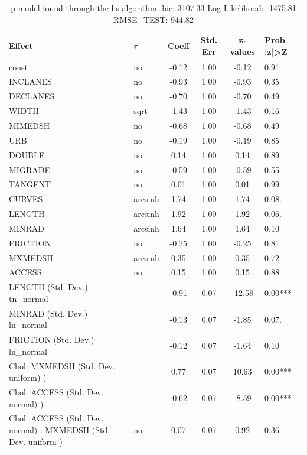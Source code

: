 \begin{table}
	\caption{p model found through the hs algorithm. bic: 3107.33 Log-Likelihood: -1475.81 RMSE_TEST: 944.82}
	\begin{center}
		\begin{tabular}{|l|l|c|c|c|l|}
			\hline
			Effect & $\tau$ & Coeff & Std. Err & z-values & Prob |z|>Z \\
			\hline
			const & no & -0.12 & 1.00 & -0.12 & 0.91 \\
			\hline
			INCLANES & no & -0.93 & 1.00 & -0.93 & 0.35 \\
			\hline
			DECLANES & no & -0.70 & 1.00 & -0.70 & 0.49 \\
			\hline
			WIDTH & sqrt & -1.43 & 1.00 & -1.43 & 0.16 \\
			\hline
			MIMEDSH & no & -0.68 & 1.00 & -0.68 & 0.49 \\
			\hline
			URB & no & -0.19 & 1.00 & -0.19 & 0.85 \\
			\hline
			DOUBLE & no & 0.14 & 1.00 & 0.14 & 0.89 \\
			\hline
			MIGRADE & no & -0.59 & 1.00 & -0.59 & 0.55 \\
			\hline
			TANGENT & no & 0.01 & 1.00 & 0.01 & 0.99 \\
			\hline
			CURVES & arcsinh & 1.74 & 1.00 & 1.74 & 0.08. \\
			\hline
			LENGTH & arcsinh & 1.92 & 1.00 & 1.92 & 0.06. \\
			\hline
			MINRAD & arcsinh & 1.64 & 1.00 & 1.64 & 0.10 \\
			\hline
			FRICTION & no & -0.25 & 1.00 & -0.25 & 0.81 \\
			\hline
			MXMEDSH & arcsinh & 0.35 & 1.00 & 0.35 & 0.72 \\
			\hline
			ACCESS & no & 0.15 & 1.00 & 0.15 & 0.88 \\
			\hline
			LENGTH (Std. Dev.) tn_normal &  & -0.91 & 0.07 & -12.58 & 0.00*** \\
			\hline
			MINRAD (Std. Dev.) ln_normal &  & -0.13 & 0.07 & -1.85 & 0.07. \\
			\hline
			FRICTION (Std. Dev.) ln_normal &  & -0.12 & 0.07 & -1.64 & 0.10 \\
			\hline
			 Chol: MXMEDSH (Std. Dev. uniform) ) &  & 0.77 & 0.07 & 10.63 & 0.00*** \\
			\hline
			 Chol: ACCESS (Std. Dev. normal) ) &  & -0.62 & 0.07 & -8.59 & 0.00*** \\
			\hline
			 Chol: ACCESS (Std. Dev. normal) . MXMEDSH (Std. Dev.   uniform ) & no & 0.07 & 0.07 & 0.92 & 0.36 \\

\end{tabular}
\end{center}
\end{table}
